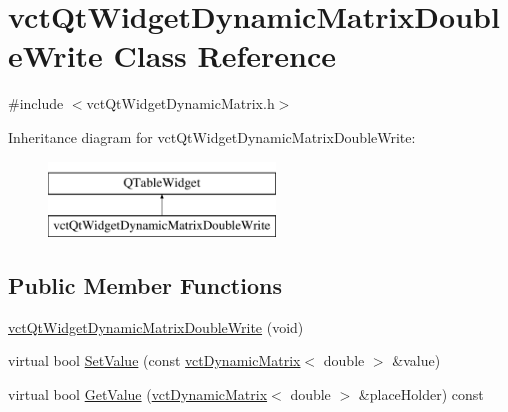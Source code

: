 \hypertarget{classvct_qt_widget_dynamic_matrix_double_write}{\section{vct\-Qt\-Widget\-Dynamic\-Matrix\-Double\-Write Class Reference}
\label{classvct_qt_widget_dynamic_matrix_double_write}
}


{\ttfamily \#include $<$vct\-Qt\-Widget\-Dynamic\-Matrix.\-h$>$}

Inheritance diagram for vct\-Qt\-Widget\-Dynamic\-Matrix\-Double\-Write\-:\begin{figure}[H]
\begin{center}
\leavevmode
\includegraphics[height=2.000000cm]{d7/ddf/classvct_qt_widget_dynamic_matrix_double_write}
\end{center}
\end{figure}
\subsection*{Public Member Functions}
\begin{DoxyCompactItemize}
\item 
\hyperlink{classvct_qt_widget_dynamic_matrix_double_write_a1990081770d88bdd6b4ed6e22c54cb4d}{vct\-Qt\-Widget\-Dynamic\-Matrix\-Double\-Write} (void)
\item 
virtual bool \hyperlink{classvct_qt_widget_dynamic_matrix_double_write_aa3c07ce66d5f1add422f431c34e064b5}{Set\-Value} (const \hyperlink{classvct_dynamic_matrix}{vct\-Dynamic\-Matrix}$<$ double $>$ \&value)
\item 
virtual bool \hyperlink{classvct_qt_widget_dynamic_matrix_double_write_ab48173a491bf09a95487f5694a684d70}{Get\-Value} (\hyperlink{classvct_dynamic_matrix}{vct\-Dynamic\-Matrix}$<$ double $>$ \&place\-Holder) const 
\end{DoxyCompactItemize}


